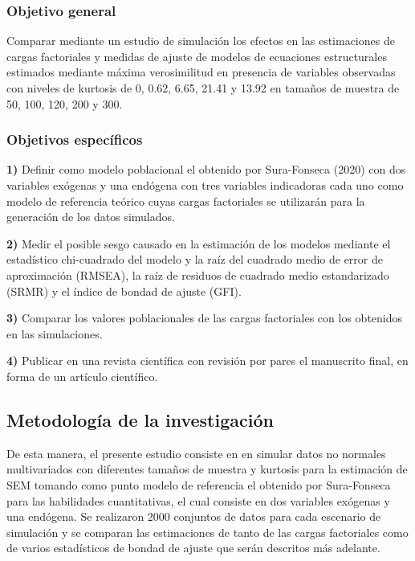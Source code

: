 \documentclass[
]{article}
\begin{document}
\subsubsection{Objetivo general}

Comparar mediante un estudio de simulación los efectos en las
estimaciones de cargas factoriales y medidas de ajuste de modelos de
ecuaciones estructurales estimados mediante máxima verosimilitud en
presencia de variables observadas con niveles de kurtosis de 0, 0.62,
6.65, 21.41 y 13.92 en tamaños de muestra de 50, 100, 120, 200 y 300.

\subsubsection{Objetivos específicos}

\textbf{1)} Definir como modelo poblacional el obtenido por Sura-Fonseca
(2020) con dos variables exógenas y una endógena con tres variables
indicadoras cada uno como modelo de referencia teórico cuyas cargas
factoriales se utilizarán para la generación de los datos simulados.

\textbf{2)} Medir el posible sesgo causado en la estimación de los
modelos mediante el estadístico chi-cuadrado del modelo y la raíz del
cuadrado medio de error de aproximación (RMSEA), la raíz de residuos de
cuadrado medio estandarizado (SRMR) y el índice de bondad de ajuste
(GFI).

\textbf{3)} Comparar los valores poblacionales de las cargas factoriales
con los obtenidos en las simulaciones.

\textbf{4)} Publicar en una revista científica con revisión por pares el
manuscrito final, en forma de un artículo científico.

\subsection{Metodología de la investigación}

De esta manera, el presente estudio consiste en en simular datos no
normales multivariados con diferentes tamaños de muestra y kurtosis para
la estimación de SEM tomando como punto modelo de referencia el obtenido
por Sura-Fonseca para las habilidades cuantitativas, el cual consiste en
dos variables exógenas y una endógena. Se realizaron 2000 conjuntos de
datos para cada escenario de simulación y se comparan las estimaciones
de tanto de las cargas factoriales como de varios estadísticos de bondad
de ajuste que serán descritos más adelante.
\end{document}
